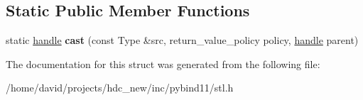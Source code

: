 \subsection*{Static Public Member Functions}
\begin{DoxyCompactItemize}
\item 
static \hyperlink{classhandle}{handle} {\bfseries cast} (const Type \&src, return\+\_\+value\+\_\+policy policy, \hyperlink{classhandle}{handle} parent)\hypertarget{structlist__caster_abaf1ddf8e27240a3c480cbd0b19b96ed}{}\label{structlist__caster_abaf1ddf8e27240a3c480cbd0b19b96ed}

\end{DoxyCompactItemize}


The documentation for this struct was generated from the following file\+:\begin{DoxyCompactItemize}
\item 
/home/david/projects/hdc\+\_\+new/inc/pybind11/stl.\+h\end{DoxyCompactItemize}
